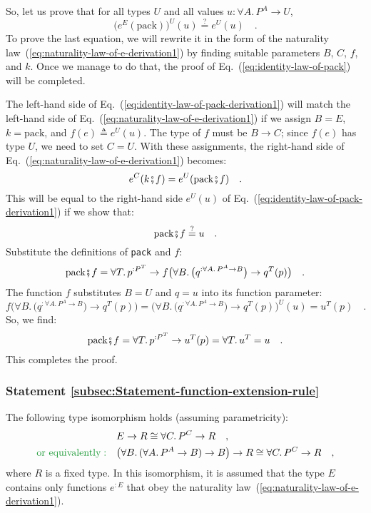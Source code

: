So, let us prove that for all types $U$ and all values $u:\forall A.\,P^{A}\rightarrow U$,
\begin{equation}
\big(e^{E}(\text{pack})\big)^{U}(u)\overset{?}{=}e^{U}(u)\quad.\label{eq:identity-law-of-pack-derivation1}
\end{equation}
To prove the last equation, we will rewrite it in the form of the
naturality law~(\ref{eq:naturality-law-of-e-derivation1}) by finding
suitable parameters $B$, $C$, $f$, and $k$. Once we manage to
do that, the proof of Eq.~(\ref{eq:identity-law-of-pack}) will be
completed. 

The left-hand side of Eq.~(\ref{eq:identity-law-of-pack-derivation1})
will match the left-hand side of Eq.~(\ref{eq:naturality-law-of-e-derivation1})
if we assign $B=E$, $k=\text{pack}$, and $f(e)\triangleq e^{U}(u)$.
The type of $f$ must be $B\rightarrow C$; since $f(e)$ has type
$U$, we need to set $C=U$. With these assignments, the right-hand
side of Eq.~(\ref{eq:naturality-law-of-e-derivation1}) becomes:
\[
e^{C}(k\bef f)=e^{U}(\text{pack}\bef f)\quad.
\]
This will be equal to the right-hand side $e^{U}(u)$ of Eq.~(\ref{eq:identity-law-of-pack-derivation1})
if we show that:
\[
\text{pack}\bef f\overset{?}{=}u\quad.
\]
Substitute the definitions of \lstinline!pack! and $f$:
\[
\text{pack}\bef f=\forall T.\,p^{:P^{T}}\rightarrow f\big(\forall B.\,\big(q^{:\forall A.\,P^{A}\rightarrow B}\big)\rightarrow q^{T}(p)\big)\quad.
\]
The function $f$ substitutes $B=U$ and $q=u$ into its function
parameter:
\[
f\big(\forall B.\,\big(q^{:\forall A.\,P^{A}\rightarrow B}\big)\rightarrow q^{T}(p)\big)=\big(\forall B.\,\big(q^{:\forall A.\,P^{A}\rightarrow B}\big)\rightarrow q^{T}(p)\big)^{U}(u)=u^{T}(p)\quad.
\]
So, we find:
\[
\text{pack}\bef f=\forall T.\,p^{:P^{T}}\rightarrow u^{T}(p)=\forall T.\,u^{T}=u\quad.
\]
This completes the proof.

\subsubsection{Statement \label{subsec:Statement-function-extension-rule}\ref{subsec:Statement-function-extension-rule}}

The following type isomorphism holds (assuming parametricity):
\begin{align*}
 & E\rightarrow R\cong\forall C.\,P^{C}\rightarrow R\quad,\\
{\color{greenunder}\text{or equivalently}:}\quad & \big(\forall B.\,(\forall A.\,P^{A}\rightarrow B)\rightarrow B\big)\rightarrow R\cong\forall C.\,P^{C}\rightarrow R\quad,
\end{align*}
where $R$ is a fixed type. In this isomorphism, it is assumed that
the type $E$ contains only functions $e^{:E}$ that obey the naturality
law~(\ref{eq:naturality-law-of-e-derivation1}).

